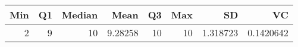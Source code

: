 
\begin{tabular}[t]{rrrrrrrr}
\toprule
Min & Q1 & Median & Mean & Q3 & Max & SD & VC\\
\midrule
2 & 9 & 10 & 9.28258 & 10 & 10 & 1.318723 & 0.1420642\\
\bottomrule
\end{tabular}